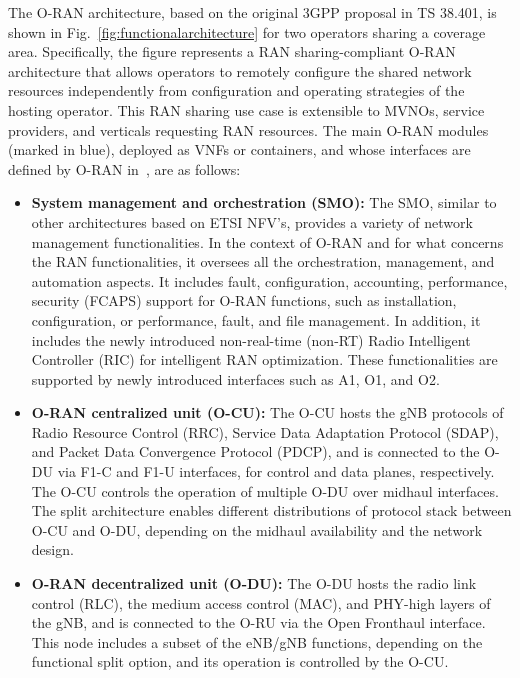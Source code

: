 \documentclass[journal]{IEEEtran}
\begin{document}
The O-RAN architecture, based on the original 3GPP proposal in TS 38.401, is shown in Fig.~\ref{fig:functionalarchitecture} for two operators sharing a coverage area. Specifically, the figure represents a RAN sharing-compliant O-RAN architecture that allows operators to remotely configure the shared network resources independently from configuration and operating strategies of the hosting operator. This RAN sharing use case is extensible to MVNOs, service providers, and verticals requesting RAN resources. The main O-RAN modules (marked in blue), deployed as VNFs or containers, and whose interfaces are defined by O-RAN in~\cite{ORAN2}, are as follows: 
\begin{itemize}
    \item \textbf{System management and orchestration (SMO):} The SMO, similar to other architectures based on ETSI NFV's, provides a variety of network management functionalities. In the context of O-RAN and for what concerns the RAN functionalities, it oversees all the orchestration, management, and automation aspects. It includes fault, configuration, accounting, performance, security (FCAPS) support for O-RAN functions, such as installation, configuration, or performance, fault, and file management. In addition, it includes the newly introduced non-real-time (non-RT) Radio Intelligent Controller (RIC) for intelligent RAN optimization. These functionalities are supported by newly introduced interfaces such as A1, O1, and O2.
    \item \textbf{O-RAN centralized unit (O-CU):} The O-CU hosts the gNB protocols of Radio Resource Control (RRC), Service Data Adaptation Protocol (SDAP), and Packet Data Convergence Protocol (PDCP), and is connected to the O-DU via F1-C and F1-U interfaces, for control and data planes, respectively. The O-CU controls the operation of multiple O-DU over midhaul interfaces. The split architecture enables different distributions of protocol stack between O-CU and O-DU, depending on the midhaul availability and the network design.
    \item \textbf{O-RAN decentralized unit (O-DU):} The O-DU hosts the radio link control (RLC), the medium access control (MAC), and PHY-high layers of the gNB, and is connected to the O-RU via the Open Fronthaul interface. This node includes a subset of the eNB/gNB functions, depending on the functional split option, and its operation is controlled by the O-CU.

\end{itemize}
\end{document}
